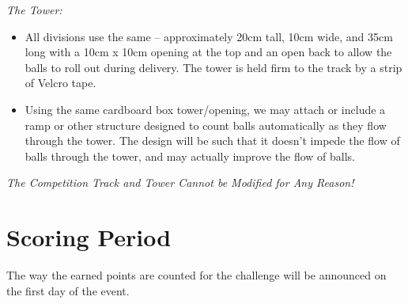\documentclass[a4paper,12pt]{article}
\begin{document}
\emph{The Tower:}
\begin{itemize}
\item All divisions use the same – approximately 20cm tall, 10cm wide, and 35cm long with a 10cm x
10cm opening at the top and an open back to allow the balls to roll out during delivery. The
tower is held firm to the track by a strip of Velcro tape.
\item Using the same cardboard box tower/opening, we may attach or include a ramp or other
structure designed to count balls automatically as they flow through the tower. The design will
be such that it doesn’t impede the flow of balls through the tower, and may actually improve the
flow of balls.
\end{itemize}
\emph{The Competition Track and Tower Cannot be Modified for Any Reason!}
\section{Scoring Period}
\par The way the earned points are counted for the challenge will be announced on the first day of the event.
\end{document}
